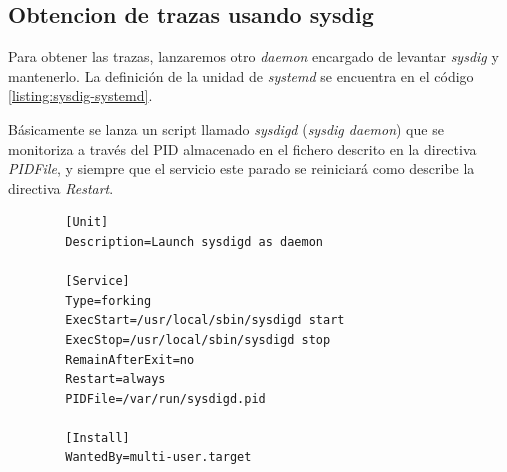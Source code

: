 \clearpage
\subsection{Obtencion de trazas usando sysdig}

Para obtener las trazas, lanzaremos otro \emph{daemon} encargado de levantar \emph{sysdig} y mantenerlo.
La definición de la unidad de \emph{systemd} se encuentra en el código \ref{listing:sysdig-systemd}. 

Básicamente se lanza un script llamado \emph{sysdigd} (\emph{sysdig daemon}) que se monitoriza a través
del PID almacenado en el fichero descrito en la directiva \emph{PIDFile}, y siempre que el servicio
este parado se reiniciará como describe la directiva \emph{Restart}.

    \begin{verbatim}
        [Unit]
        Description=Launch sysdigd as daemon
        
        [Service]
        Type=forking
        ExecStart=/usr/local/sbin/sysdigd start
        ExecStop=/usr/local/sbin/sysdigd stop
        RemainAfterExit=no
        Restart=always
        PIDFile=/var/run/sysdigd.pid
        
        [Install]
        WantedBy=multi-user.target
    \end{verbatim}
\bigskip

